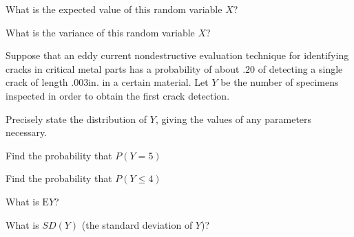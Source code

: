 \documentclass[addpoints]{examsetup}
\begin{document}
\begin{questions}
\begin{subparts}
               \subpart[2] What is the expected value of this random variable $X$?
               \hfill {}
               \vspace{2cm}       
                              
               \subpart[2] What is the variance  of this random variable $X$?
               \hfill {}
               \vspace{2cm}          
         
         \end{subparts}

\pagebreak
\question
Suppose that an eddy current nondestructive evaluation technique for identifying cracks in critical metal parts has a probability of about $.20$ of detecting a single crack of length $.003$in. in a certain material. Let $Y$ be the number of specimens inspected in order to obtain the first crack detection.
\vspace{1cm}
         \begin{subparts}
                  \subpart[2] Precisely state the distribution of $Y$, giving the values of any parameters necessary.
                  \vspace{2cm}
                  
                  \subpart[3] Find the probability that $P(Y = 5)$
                  \hfill {}
                  \vspace{5cm}
                  
                  \subpart[3] Find the probability that $P(Y \le 4)$
                  \hfill {}
                  \vspace{5cm}
                  
                  \subpart[2] What is $\text{E}Y$?
                  \hfill {}
                  \vspace{2cm}
                  
                  
                  \subpart[2] What is $SD{(Y)}$ (the standard deviation of $Y$)?
                  \hfill {}
                  \vspace{2cm}                                    
                           
         \end{subparts}

\end{questions}
\end{document}
